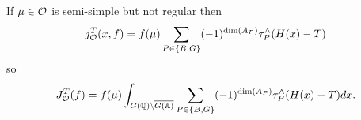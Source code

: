 If $\mu \in {\cal{O}}$ is semi-simple but not regular then 
\[
j_{{\cal{O}}}^T(x,f)
=f(\mu )\sum_{P\in \{B,G\}}(-1)^{\dim (A_P)}
\tau_P^{\wedge }(H(x)-T) 
\]
so 
\begin{equation}
J_{{\cal{O}}}^T(f)=f(\mu )
\int_{G({\mathbb{Q}})\backslash \overline{G({\mathbb{A}})}}
\sum_{P\in \{B,G\}}(-1)^{\dim (A_P)}
\tau _P^{\wedge }(H(x)-T)dx.  \nonumber
\end{equation}


